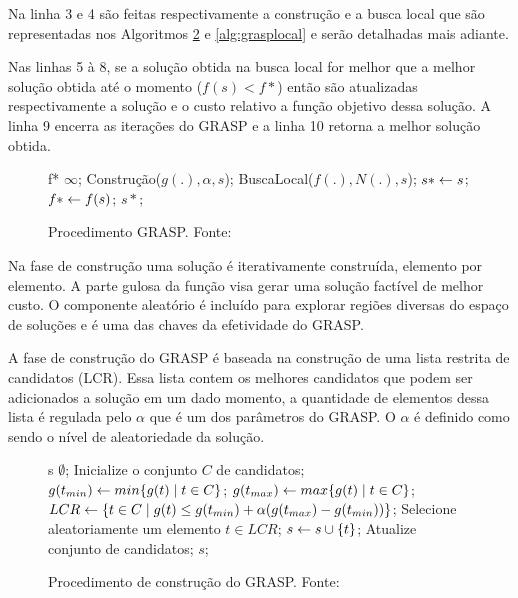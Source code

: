 Na linha 3 e 4 são feitas respectivamente a construção e a busca local que são representadas nos Algoritmos \ref{alg:graspcons} e \ref{alg:grasplocal} e serão detalhadas mais adiante.

Nas linhas 5 à 8, se a solução obtida na busca local for melhor que a melhor solução obtida até o momento ($f(s) < f{*}$) então são atualizadas respectivamente a solução e o custo relativo a função objetivo dessa solução. 
A linha 9 encerra as iterações do GRASP e a linha 10 retorna a melhor solução obtida.

\begin{figure}[h]
\caption{Procedimento GRASP. \mbox{Fonte: \cite{resende1995}}}\label{alg:grasp}
\begin{programma}
\STATE f{*} \GETS $\infty$;
\STATE Construção($g(.), \alpha, s$);
\STATE BuscaLocal($f(.),N(.),s$);
\STATE $s{*} \leftarrow s$;
\STATE $f{*} \leftarrow f(s)$;
\ENDIF
\ENDFOR
\STATE\RETURN $s{*}$;
\ENDALGORITHM
\end{programma}
\end{figure}

Na fase de construção uma solução é iterativamente construída, elemento por elemento. A parte gulosa da função visa gerar uma solução factível de melhor custo. O componente aleatório é incluído para explorar
regiões diversas do espaço de soluções e é uma das chaves da efetividade do GRASP.

A fase de construção do GRASP é baseada na construção de uma lista restrita de candidatos (LCR). Essa lista contem os melhores candidatos que podem ser adicionados a solução em um dado momento, a quantidade de elementos dessa lista é regulada pelo $\alpha$ que é um dos parâmetros do GRASP. O $\alpha$ é definido como sendo o nível de aleatoriedade da solução.

\begin{figure}[h]
\caption{Procedimento de construção do GRASP. \mbox{Fonte:
\cite{resende1995}}}\label{alg:graspcons}
\begin{programma}
\STATE s \GETS $\emptyset$;
\STATE Inicialize o conjunto $C$ de candidatos;
\STATE $g(t_{min}) \leftarrow min\{g(t) \mid t \in C\}$;
\STATE $g(t_{max}) \leftarrow max\{g(t) \mid t \in C\}$;
\STATE $LCR \leftarrow \{t \in C \mid g(t) \leq g(t_{min}) + \alpha(g(t_{max}) - g(t_{min}))\}$;
\STATE Selecione aleatoriamente um elemento $t \in LCR$;
\STATE $s \leftarrow s \cup \{t\}$;
\STATE Atualize conjunto de candidatos;
\ENDWHILE
\STATE\RETURN $s$;
\ENDALGORITHM
\end{programma}
\end{figure}

